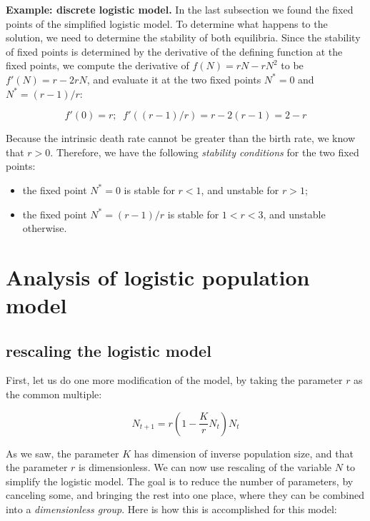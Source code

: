 \documentclass[
  letterpaper,
  DIV=11,
  numbers=noendperiod]{scrreprt}
\begin{document}
\textbf{Example: discrete logistic model.} In the last subsection we
found the fixed points of the simplified logistic model. To determine
what happens to the solution, we need to determine the stability of both
equilibria. Since the stability of fixed points is determined by the
derivative of the defining function at the fixed points, we compute the
derivative of \(f(N) = rN-rN^2\) to be \(f'(N) = r-2rN\), and evaluate
it at the two fixed points \(N^* = 0\) and \(N^* = (r-1)/r\):

\[
f'(0) = r; \; \; f'((r-1)/r) = r-2(r-1) = 2-r
\]

Because the intrinsic death rate cannot be greater than the birth rate,
we know that \(r>0\). Therefore, we have the following \emph{stability
conditions} for the two fixed points:

\begin{itemize}
\item
  the fixed point \(N^*=0\) is stable for \(r<1\), and unstable for
  \(r>1\);
\item
  the fixed point \(N^*= (r-1)/r\) is stable for \(1<r<3\), and unstable
  otherwise.
\end{itemize}

\hypertarget{analysis-of-logistic-population-model}{%
\section{Analysis of logistic population
model}\label{analysis-of-logistic-population-model}}

\hypertarget{rescaling-the-logistic-model}{%
\subsection{rescaling the logistic
model}\label{rescaling-the-logistic-model}}

First, let us do one more modification of the model, by taking the
parameter \(r\) as the common multiple:

\[
N_{t+1} = r(1 - \frac{K}{r} N_t) N_t
\]

As we saw, the parameter \(K\) has dimension of inverse population size,
and that the parameter \(r\) is dimensionless. We can now use rescaling
of the variable \(N\) to simplify the logistic model. The goal is to
reduce the number of parameters, by canceling some, and bringing the
rest into one place, where they can be combined into a
\emph{dimensionless group}. Here is how this is accomplished for this
model:
\end{document}
